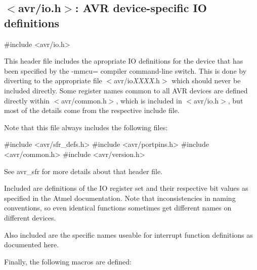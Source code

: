 \subsection{$<$avr/io.h$>$: AVR device-\/specific IO definitions}
\label{group__avr__io}

\begin{DoxyCode}
 #include <avr/io.h> 
\end{DoxyCode}


This header file includes the apropriate IO definitions for the device that has been specified by the {\ttfamily -\/mmcu=} compiler command-\/line switch. This is done by diverting to the appropriate file {\ttfamily $<$avr/io}{\itshape XXXX\/}{\ttfamily .h$>$} which should never be included directly. Some register names common to all AVR devices are defined directly within {\ttfamily $<$avr/common.h$>$}, which is included in {\ttfamily $<$avr/io.h$>$}, but most of the details come from the respective include file.

Note that this file always includes the following files: 
\begin{DoxyCode}
    #include <avr/sfr_defs.h>
    #include <avr/portpins.h>
    #include <avr/common.h>
    #include <avr/version.h>
\end{DoxyCode}
 See avr\_\-sfr for more details about that header file.

Included are definitions of the IO register set and their respective bit values as specified in the Atmel documentation. Note that inconsistencies in naming conventions, so even identical functions sometimes get different names on different devices.

Also included are the specific names useable for interrupt function definitions as documented here.

Finally, the following macros are defined:


